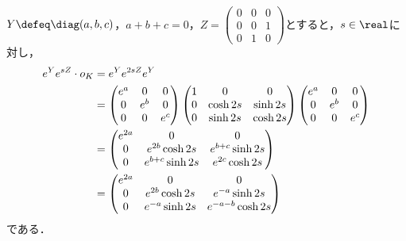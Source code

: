 \begin{npfwn}
  $Y \defeq \diag(a,b,c)  $，$a + b + c = 0$，$Z =
  \begin{pmatrix}
    0 & 0 & 0\\
    0 & 0 & 1\\
    0 & 1 & 0
  \end{pmatrix}
  $とすると，$s\in \real$に対し，
  \begin{align}
    e^{Y}e^{sZ}\cdot o_K &= e^{Y}e^{2sZ}e^{Y}\notag\\
                         &=
                           \begin{pmatrix}
                             e^{a} & 0 & 0 \\
                             0 & e^{b} & 0\\
                             0 & 0 & e^{c}
                           \end{pmatrix}
                                     \begin{pmatrix}
                                       1 & 0 & 0\\
                                       0 & \cosh 2s & \sinh 2s \\
                                       0 & \sinh 2s & \cosh 2s
                                     \end{pmatrix}
                                                      \begin{pmatrix}
                                                        e^{a} & 0 & 0 \\
                                                        0 & e^{b} & 0\\
                                                        0 & 0 & e^{c}
                                                      \end{pmatrix}\notag\\
                         &=
                           \begin{pmatrix}
                             e^{2a} & 0 & 0\\
                             0 & e^{2b}\cosh 2s & e^{b+c}\sinh 2s \\
                             0 & e^{b+c}\sinh 2s & e^{2c}\cosh 2s
                           \end{pmatrix}\notag\\
                         &= \begin{pmatrix}
                             e^{2a} & 0 & 0\\
                             0 & e^{2b}\cosh 2s & e^{-a}\sinh 2s \\
                             0 & e^{-a}\sinh 2s & e^{-a-b}\cosh 2s
                           \end{pmatrix}\label{eq:0114-2}
  \end{align}
  である．


\end{npfwn}
